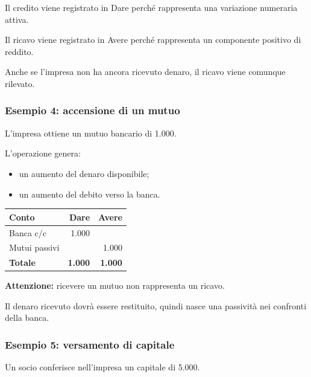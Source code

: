 \noindent Il credito viene registrato in Dare
perché rappresenta una variazione numeraria attiva.

\medskip

\noindent Il ricavo viene registrato in Avere
perché rappresenta un componente positivo di reddito.

\medskip

\noindent Anche se l'impresa non ha ancora ricevuto denaro,
il ricavo viene comunque rilevato.


\subsubsection*{Esempio 4: accensione di un mutuo}

\noindent L'impresa ottiene un mutuo bancario di 1.000.

\medskip

\noindent L'operazione genera:

\begin{itemize}
    \item un aumento del denaro disponibile;
    \item un aumento del debito verso la banca.
\end{itemize}

\begin{center}
\begin{tabular}{|l|r|r|}
\hline
\textbf{Conto} & \textbf{Dare} & \textbf{Avere} \\
\hline
Banca c/c & 1.000 & \\
\hline
Mutui passivi & & 1.000 \\
\hline
\textbf{Totale} & \textbf{1.000} & \textbf{1.000} \\
\hline
\end{tabular}
\end{center}

\noindent \textbf{Attenzione:} ricevere un mutuo
non rappresenta un ricavo.

\medskip

\noindent Il denaro ricevuto dovrà essere restituito,
quindi nasce una passività nei confronti della banca.


\subsubsection*{Esempio 5: versamento di capitale}

\noindent Un socio conferisce nell'impresa
un capitale di 5.000.

